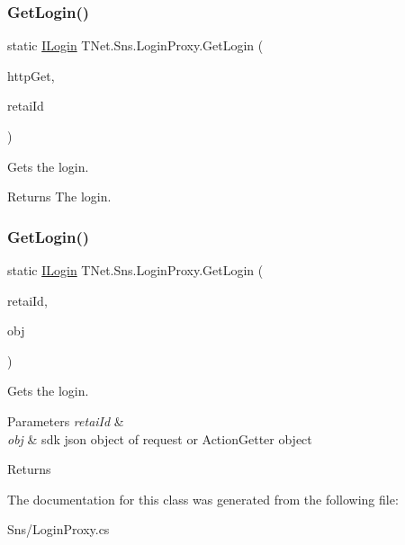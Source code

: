 \subsubsection{\texorpdfstring{Get\+Login()}{GetLogin()}\hspace{0.1cm}{\footnotesize\ttfamily [1/2]}}
{\footnotesize\ttfamily static \mbox{\hyperlink{interface_t_net_1_1_sns_1_1_i_login}{I\+Login}} T\+Net.\+Sns.\+Login\+Proxy.\+Get\+Login (\begin{DoxyParamCaption}\item[{\mbox{\hyperlink{class_t_net_1_1_service_1_1_action_getter}{Action\+Getter}}}]{http\+Get,  }\item[{string}]{retai\+Id }\end{DoxyParamCaption})\hspace{0.3cm}{\ttfamily [static]}}



Gets the login. 

\begin{DoxyReturn}{Returns}
The login.
\end{DoxyReturn}
\mbox{\label{class_t_net_1_1_sns_1_1_login_proxy_a08e1676ec0b525d64e383e30f546e54a}} 
\subsubsection{\texorpdfstring{Get\+Login()}{GetLogin()}\hspace{0.1cm}{\footnotesize\ttfamily [2/2]}}
{\footnotesize\ttfamily static \mbox{\hyperlink{interface_t_net_1_1_sns_1_1_i_login}{I\+Login}} T\+Net.\+Sns.\+Login\+Proxy.\+Get\+Login (\begin{DoxyParamCaption}\item[{string}]{retai\+Id,  }\item[{object}]{obj }\end{DoxyParamCaption})\hspace{0.3cm}{\ttfamily [static]}}



Gets the login. 


\begin{DoxyParams}{Parameters}
{\em retai\+Id} & \\
\hline
{\em obj} & sdk json object of request or Action\+Getter object\\
\hline
\end{DoxyParams}
\begin{DoxyReturn}{Returns}

\end{DoxyReturn}


The documentation for this class was generated from the following file\+:\begin{DoxyCompactItemize}
\item 
Sns/Login\+Proxy.\+cs\end{DoxyCompactItemize}
